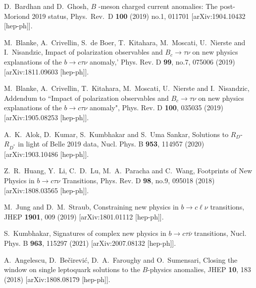 \documentclass[reprint,showpacs,aps,prd,nofootinbib,superscriptaddress,longbibliography]{revtex4-1}
\begin{document}
\begin{thebibliography}{99}
  D.~Bardhan and D.~Ghosh, $B$ -meson charged current anomalies: The post-Moriond 2019 status,
  Phys.\ Rev.\ D {\bf 100} (2019) no.1,  011701
  [arXiv:1904.10432 [hep-ph]].
 
 
M.~Blanke, A.~Crivellin, S.~de Boer, T.~Kitahara, M.~Moscati, U.~Nierste and I.~Nisandzic, Impact of polarization observables and $ B_c\to \tau \nu$ on new physics explanations of the $b\to c \tau \nu$ anomaly,'
Phys. Rev. D \textbf{99}, no.7, 075006 (2019)
[arXiv:1811.09603 [hep-ph]].

M.~Blanke, A.~Crivellin, T.~Kitahara, M.~Moscati, U.~Nierste and I.~Nisandzic, Addendum to “Impact of polarization observables and $B_c\to \tau \nu$ on new physics explanations of the $b\to c \tau \nu$ anomaly",
Phys. Rev. D \textbf{100}, 035035 (2019)
[arXiv:1905.08253 [hep-ph]].

A.~K.~Alok, D.~Kumar, S.~Kumbhakar and S.~Uma Sankar, Solutions to $R_D$-$R_{D^*}$ in light of Belle 2019 data,
Nucl. Phys. B \textbf{953}, 114957 (2020)
[arXiv:1903.10486 [hep-ph]].

Z.~R.~Huang, Y.~Li, C.~D.~Lu, M.~A.~Paracha and C.~Wang, Footprints of New Physics in $b\to c\tau\nu$ Transitions, Phys. Rev. D \textbf{98}, no.9, 095018 (2018)
[arXiv:1808.03565 [hep-ph]].

M.~Jung and D.~M.~Straub, Constraining new physics in $b\to c\ell\nu$ transitions,  JHEP {\bf 1901}, 009 (2019)
[arXiv:1801.01112 [hep-ph]].
  
S.~Kumbhakar, Signatures of complex new physics in $b\to c\tau\bar{\nu}$ transitions,
Nucl. Phys. B \textbf{963}, 115297 (2021)
[arXiv:2007.08132 [hep-ph]].

 
A.~Angelescu, D.~Be\v{c}irevi\'c, D.~A.~Faroughy and O.~Sumensari, Closing the window on single leptoquark solutions to the $B$-physics anomalies, JHEP \textbf{10}, 183 (2018)
[arXiv:1808.08179 [hep-ph]].


\end{thebibliography}
\end{document}
